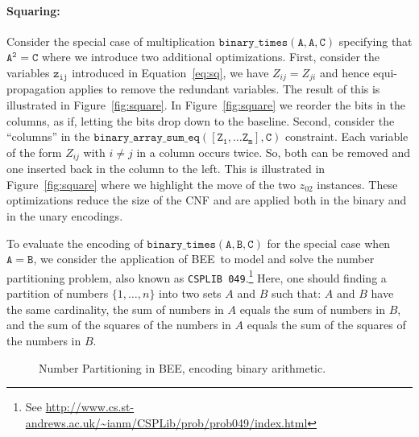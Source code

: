 \documentclass[runningheads,a4paper]{llncs}
\newcommand{\bee}{\textsf{BEE}}
\begin{document}
\paragraph{\bf Squaring:~~}

Consider the special case of multiplication
$\mathtt{binary\_times(A,A,C)}$ specifying that $\mathtt{A^2=C}$ where
we introduce two additional optimizations. First, consider the
variables $\mathtt{z_{ij}}$ introduced in Equation~\ref{eq:sq}, we
have $Z_{ij}=Z_{ji}$ and hence equi-propagation applies to remove the
redundant variables. The result of this is illustrated in
Figure~\ref{fig:square}. In
Figure~\ref{fig:square} we reorder the bits in the
columns, as if, letting the bits drop down to the baseline.  Second,
consider the ``columns'' in the
$\mathtt{binary\_array\_sum\_eq([Z_1,\ldots Z_m],C)}$ constraint. Each
variable of the form $Z_{ij}$ with $i\neq j$ in a column occurs
twice. So, both can be removed and one inserted back in the column to
the left. This is illustrated in
Figure~\ref{fig:square} where we highlight the
move of the two $z_{02}$ instances. These optimizations reduce the
size of the CNF and are applied both in the binary and in the unary
encodings. 



To evaluate the encoding of $\mathtt{binary\_times(A,B,C)}$ for the
special case when $\mathtt{A=B}$, we consider the application of \bee\
to model and solve the number partitioning problem, also known as
\texttt{CSPLIB 049}.\footnote{See
  \url{http://www.cs.st-andrews.ac.uk/~ianm/CSPLib/prob/prob049/index.html}}
Here, one should finding a partition of numbers $\{1,\ldots,n\}$ into
two sets $A$ and $B$ such that: $A$ and $B$ have the same cardinality,
the sum of numbers in $A$  equals the sum of numbers in $B$, and
the sum of the squares of the numbers in $A$ equals the sum of the
squares of the numbers in $B$. 

\begin{figure}
  \centering
  




\caption{Number Partitioning in \bee, encoding binary arithmetic.}
\label{fig:compareNumPartition}
\end{figure}
 
\end{document}
